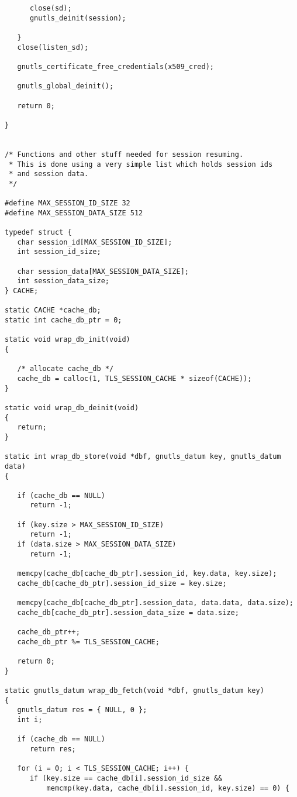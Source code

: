 \begin{verbatim}
      close(sd);
      gnutls_deinit(session);

   }
   close(listen_sd);

   gnutls_certificate_free_credentials(x509_cred);

   gnutls_global_deinit();

   return 0;

}


/* Functions and other stuff needed for session resuming.
 * This is done using a very simple list which holds session ids
 * and session data.
 */

#define MAX_SESSION_ID_SIZE 32
#define MAX_SESSION_DATA_SIZE 512

typedef struct {
   char session_id[MAX_SESSION_ID_SIZE];
   int session_id_size;

   char session_data[MAX_SESSION_DATA_SIZE];
   int session_data_size;
} CACHE;

static CACHE *cache_db;
static int cache_db_ptr = 0;

static void wrap_db_init(void)
{

   /* allocate cache_db */
   cache_db = calloc(1, TLS_SESSION_CACHE * sizeof(CACHE));
}

static void wrap_db_deinit(void)
{
   return;
}

static int wrap_db_store(void *dbf, gnutls_datum key, gnutls_datum data)
{

   if (cache_db == NULL)
      return -1;

   if (key.size > MAX_SESSION_ID_SIZE)
      return -1;
   if (data.size > MAX_SESSION_DATA_SIZE)
      return -1;

   memcpy(cache_db[cache_db_ptr].session_id, key.data, key.size);
   cache_db[cache_db_ptr].session_id_size = key.size;

   memcpy(cache_db[cache_db_ptr].session_data, data.data, data.size);
   cache_db[cache_db_ptr].session_data_size = data.size;

   cache_db_ptr++;
   cache_db_ptr %= TLS_SESSION_CACHE;

   return 0;
}

static gnutls_datum wrap_db_fetch(void *dbf, gnutls_datum key)
{
   gnutls_datum res = { NULL, 0 };
   int i;

   if (cache_db == NULL)
      return res;

   for (i = 0; i < TLS_SESSION_CACHE; i++) {
      if (key.size == cache_db[i].session_id_size &&
          memcmp(key.data, cache_db[i].session_id, key.size) == 0) {



\end{verbatim}
